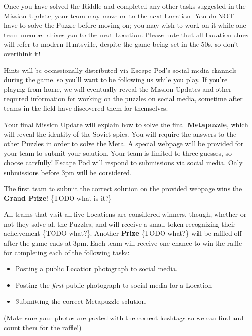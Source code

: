 \documentclass{puzzlehunt}
\begin{document}
Once you have solved the Riddle and completed any other tasks suggested in
the Mission Update, your team may move on to the next Location. You do NOT have
to solve the Puzzle before moving on; you may wish to work on it while one team member
drives you to the next Location. Please note that all Location clues will refer to
modern Huntsville, despite the game being set in the 50s, so don't overthink it!

Hints will be occassionally distributed via Escape Pod's social media channels
during the game, so you'll want to be following us while you play. If you're playing
from home, we will eventually reveal the Mission Updates and other required information
for working on the puzzles on social media, sometime after teams in the field have
discovered them for themselves.


Your final Mission Update will explain how to solve the final
\textbf{Metapuzzle}, which will reveal the identity of the Soviet spies.
You will require the answers to the other Puzzles in order to solve the Meta.
A special webpage will be provided for your team to submit your solution. Your
team is limited to three guesses, so choose carefully! Escape Pod will respond
to submissions via social media. Only submissions before 3pm will be considered.


The first team to submit the correct solution on the provided webpage wins the
\textbf{Grand Prize}! \{TODO what is it?\}

All teams that visit all five Locations are considered winners, though, whether
or not they solve all the Puzzles, and will receive a small token recognizing
their acheivement \{TODO what?\}. Another \textbf{Prize} \{TODO what?\} will be
raffled off after the game ends at 3pm. Each team will receive one chance to
win the raffle for completing each of the following tasks:

\begin{itemize}
  \item Posting a public Location photograph to social media.
  \item Posting the \textit{first} public photograph to social media for a Location
  \item Submitting the correct Metapuzzle solution.
\end{itemize}

(Make sure your photos are posted with the correct hashtags so we can find
and count them for the raffle!)
\end{document}
